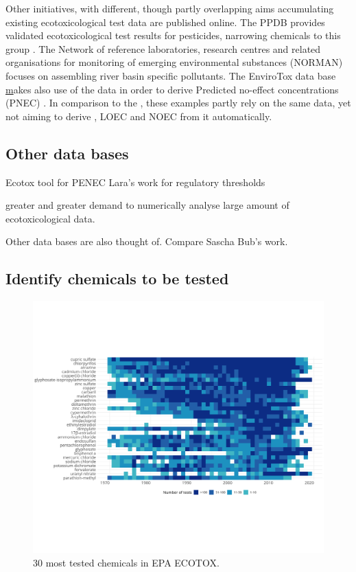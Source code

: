 Other initiatives, with different, though partly overlapping aims accumulating existing ecotoxicological test data are published online. The PPDB provides validated ecotoxicological test results for pesticides, narrowing chemicals to this group \citep{lewis_international_2016}. The Network of reference laboratories, research centres and related organisations for monitoring of emerging environmental substances (NORMAN) focuses on assembling river basin specific pollutants\citep{von_der_ohe_new_2011}. The EnviroTox data base \href{https://envirotoxdatabase.org/} makes also use of the \epa{} data in order to derive Predicted no-effect concentrations (PNEC) \citep{health_and_environmental_sciences_institute_hesi_envirotox_2019}. In comparison to the \etoxbase, these examples partly rely on the same data, yet not aiming to derive \ecfifty, LOEC and NOEC from it automatically.
\subsection*{Other data bases}

Ecotox tool for PENEC
Lara's work for regulatory thresholds


greater and greater demand to numerically  analyse large amount of ecotoxicological data.

Other data bases are also thought of. Compare Sascha Bub's work.



\subsection*{Identify chemicals to be tested}

\begin{figure}
    \includegraphics[width=1\linewidth]{article/figures/heatmap_tests_n.png}
    \caption{30 most tested chemicals in EPA ECOTOX.}
    \label{fig:standartox_ppdb_diff}
\end{figure}



